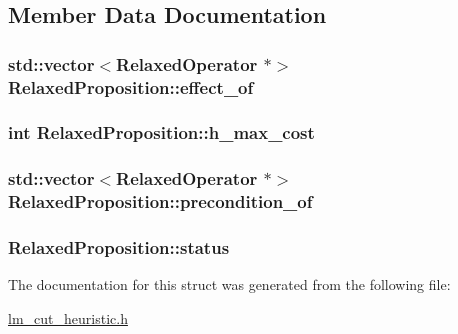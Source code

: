 \subsection{Member Data Documentation}
\hypertarget{structRelaxedProposition_a5679f5937f62ed7f3e4158c1163e508f}{
\subsubsection[{effect\-\_\-of}]{\setlength{\rightskip}{0pt plus 5cm}std\-::vector$<${\bf Relaxed\-Operator} $\ast$$>$ Relaxed\-Proposition\-::effect\-\_\-of}}\label{structRelaxedProposition_a5679f5937f62ed7f3e4158c1163e508f}
\hypertarget{structRelaxedProposition_a67c1a074af9bdadc4d3e7ac27e73a827}{
\subsubsection[{h\-\_\-max\-\_\-cost}]{\setlength{\rightskip}{0pt plus 5cm}int Relaxed\-Proposition\-::h\-\_\-max\-\_\-cost}}\label{structRelaxedProposition_a67c1a074af9bdadc4d3e7ac27e73a827}
\hypertarget{structRelaxedProposition_af09b9d4415f4f773df07e9cdddbf231e}{
\subsubsection[{precondition\-\_\-of}]{\setlength{\rightskip}{0pt plus 5cm}std\-::vector$<${\bf Relaxed\-Operator} $\ast$$>$ Relaxed\-Proposition\-::precondition\-\_\-of}}\label{structRelaxedProposition_af09b9d4415f4f773df07e9cdddbf231e}
\hypertarget{structRelaxedProposition_ae220b85dd3767656e8882afa9209fcbc}{
\subsubsection[{status}]{ Relaxed\-Proposition\-::status}}\label{structRelaxedProposition_ae220b85dd3767656e8882afa9209fcbc}


The documentation for this struct was generated from the following file\-:\begin{DoxyCompactItemize}
\item 
\hyperlink{lm__cut__heuristic_8h}{lm\-\_\-cut\-\_\-heuristic.\-h}\end{DoxyCompactItemize}
